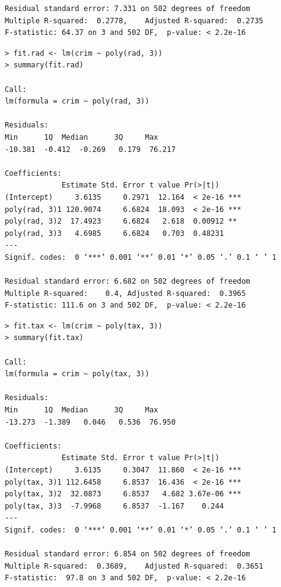 \documentclass{article}
\begin{document}
\begin{itemize}
\begin{program}
\begin{verbatim}
	Residual standard error: 7.331 on 502 degrees of freedom
	Multiple R-squared:  0.2778,	Adjusted R-squared:  0.2735 
	F-statistic: 64.37 on 3 and 502 DF,  p-value: < 2.2e-16
	\end{verbatim}
\end{program}


\begin{program}
	\begin{verbatim}
	> fit.rad <- lm(crim ~ poly(rad, 3))
	> summary(fit.rad)
	
	Call:
	lm(formula = crim ~ poly(rad, 3))
	
	Residuals:
	Min      1Q  Median      3Q     Max 
	-10.381  -0.412  -0.269   0.179  76.217 
	
	Coefficients:
	             Estimate Std. Error t value Pr(>|t|)    
	(Intercept)     3.6135     0.2971  12.164  < 2e-16 ***
	poly(rad, 3)1 120.9074     6.6824  18.093  < 2e-16 ***
	poly(rad, 3)2  17.4923     6.6824   2.618  0.00912 ** 
	poly(rad, 3)3   4.6985     6.6824   0.703  0.48231    
	---
	Signif. codes:  0 ‘***’ 0.001 ‘**’ 0.01 ‘*’ 0.05 ‘.’ 0.1 ‘ ’ 1
	
	Residual standard error: 6.682 on 502 degrees of freedom
	Multiple R-squared:    0.4,	Adjusted R-squared:  0.3965 
	F-statistic: 111.6 on 3 and 502 DF,  p-value: < 2.2e-16
	\end{verbatim}
\end{program}


\begin{program}
	\begin{verbatim}
	> fit.tax <- lm(crim ~ poly(tax, 3))
	> summary(fit.tax)
	
	Call:
	lm(formula = crim ~ poly(tax, 3))
	
	Residuals:
	Min      1Q  Median      3Q     Max 
	-13.273  -1.389   0.046   0.536  76.950 
	
	Coefficients:
	             Estimate Std. Error t value Pr(>|t|)    
	(Intercept)     3.6135     0.3047  11.860  < 2e-16 ***
	poly(tax, 3)1 112.6458     6.8537  16.436  < 2e-16 ***
	poly(tax, 3)2  32.0873     6.8537   4.682 3.67e-06 ***
	poly(tax, 3)3  -7.9968     6.8537  -1.167    0.244    
	---
	Signif. codes:  0 ‘***’ 0.001 ‘**’ 0.01 ‘*’ 0.05 ‘.’ 0.1 ‘ ’ 1
	
	Residual standard error: 6.854 on 502 degrees of freedom
	Multiple R-squared:  0.3689,	Adjusted R-squared:  0.3651 
	F-statistic:  97.8 on 3 and 502 DF,  p-value: < 2.2e-16
	
	\end{verbatim}
\end{program}



\end{itemize}
\end{document}
